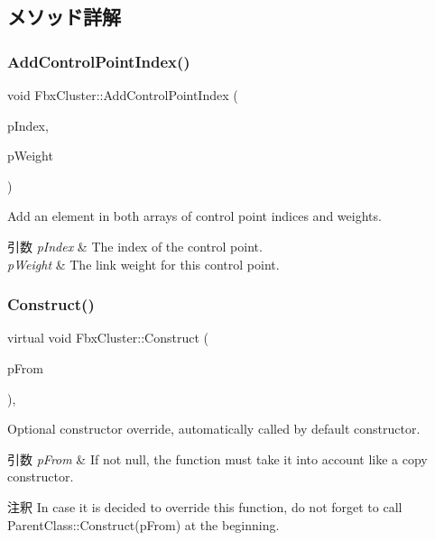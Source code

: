 \subsection{メソッド詳解}
\mbox{\label{class_fbx_cluster_a877236816286cd8c5dcfa349ece9bee0}} 
\subsubsection{\texorpdfstring{Add\+Control\+Point\+Index()}{AddControlPointIndex()}}
{\footnotesize\ttfamily void Fbx\+Cluster\+::\+Add\+Control\+Point\+Index (\begin{DoxyParamCaption}\item[{int}]{p\+Index,  }\item[{double}]{p\+Weight }\end{DoxyParamCaption})}

Add an element in both arrays of control point indices and weights. 
\begin{DoxyParams}{引数}
{\em p\+Index} & The index of the control point. \\
\hline
{\em p\+Weight} & The link weight for this control point. \\
\hline
\end{DoxyParams}
\mbox{\label{class_fbx_cluster_a80619129929789d80930b2bbb524593c}} 
\subsubsection{\texorpdfstring{Construct()}{Construct()}}
{\footnotesize\ttfamily virtual void Fbx\+Cluster\+::\+Construct (\begin{DoxyParamCaption}\item[{const \hyperlink{class_fbx_object}{Fbx\+Object} $\ast$}]{p\+From }\end{DoxyParamCaption})\hspace{0.3cm}{\ttfamily [protected]}, {\ttfamily [virtual]}}

Optional constructor override, automatically called by default constructor. 
\begin{DoxyParams}{引数}
{\em p\+From} & If not null, the function must take it into account like a copy constructor. \\
\hline
\end{DoxyParams}
\begin{DoxyRemark}{注釈}
In case it is decided to override this function, do not forget to call Parent\+Class\+::\+Construct(p\+From) at the beginning. 
\end{DoxyRemark}


